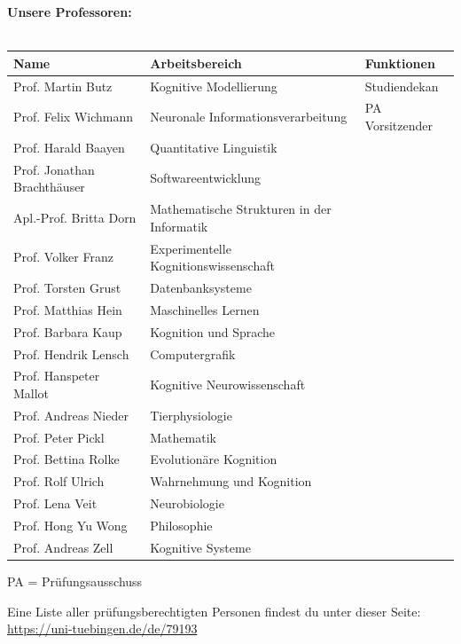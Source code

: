 \renewcommand{\arraystretch}{1}
\normalsize 
\textbf{Unsere Professoren:}\\\\
\footnotesize

\begin{tabular}{|p{}p{}p{}|}
\hline
Name						& Arbeitsbereich							& Funktionen \\
\hline
\hline
Prof. Martin Butz 		& Kognitive Modellierung					& Studiendekan	\\
Prof. Felix Wichmann 	& Neuronale Informationsverarbeitung		& PA Vorsitzender\\
Prof. Harald Baayen 		& Quantitative Linguistik 				& \\
Prof. Jonathan Brachthäuser  & Softwareentwicklung         		& \\
Apl.-Prof. Britta Dorn 	& Mathematische Strukturen in der Informatik &\\
Prof. Volker Franz		& Experimentelle Kognitionswissenschaft	& \\
Prof. Torsten Grust		& Datenbanksysteme                     	& \\
Prof. Matthias Hein		& Maschinelles Lernen   			        	& \\
Prof. Barbara Kaup 		& Kognition und Sprache					& \\
Prof. Hendrik Lensch 	& Computergrafik                    		& \\
Prof. Hanspeter Mallot 	& Kognitive Neurowissenschaft	        	& \\
Prof. Andreas Nieder 	& Tierphysiologie				 		& \\
Prof. Peter Pickl 		& Mathematik                            	& \\
Prof. Bettina Rolke		& Evolutionäre Kognition	              	& \\
Prof. Rolf Ulrich		& Wahrnehmung und Kognition	            	& \\
Prof. Lena Veit 			& Neurobiologie							& \\
Prof. Hong Yu Wong 		& Philosophie							& \\
Prof. Andreas Zell 		& Kognitive Systeme 		               	& \\
\hline
\end{tabular}

\scriptsize{PA = Prüfungsausschuss}

Eine Liste aller prüfungsberechtigten Personen findest du unter dieser Seite: \url{https://uni-tuebingen.de/de/79193}

